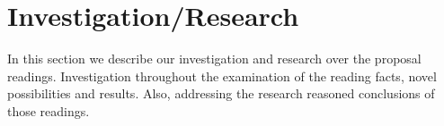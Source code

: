 \section{Investigation/Research}

In this section we describe our investigation and research over the proposal readings. Investigation throughout the examination of the reading facts, novel possibilities and results. Also, addressing the research reasoned conclusions of those readings.